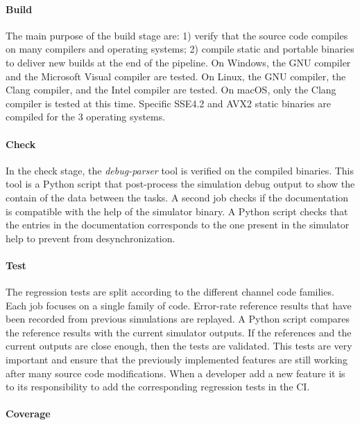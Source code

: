 \paragraph{Build}

The main purpose of the build stage are: 1) verify that the \AFFECT source code
compiles on many compilers and operating systems; 2) compile static and portable
binaries to deliver new builds at the end of the pipeline. On Windows, the GNU
compiler and the Microsoft Visual compiler are tested. On Linux, the GNU
compiler, the Clang compiler, and the Intel compiler are  tested. On macOS, only
the Clang compiler is tested at this time. Specific SSE4.2 and AVX2 static
binaries are compiled for the 3 operating systems.

\paragraph{Check}

In the check stage, the \emph{debug-parser} tool is verified on the compiled
\AFFECT binaries. This tool is a Python script that post-process the \AFFECT
simulation debug output to show the contain of the data between the tasks. A
second job checks if the documentation is compatible with the help of the
\AFFECT simulator binary. A Python script checks that the entries in the
documentation corresponds to the one present in the simulator help to prevent
from desynchronization.

\paragraph{Test}

The regression tests are split according to the different channel code families.
Each job focuses on a single family of code. Error-rate reference results that
have been recorded from previous simulations are replayed. A Python script
compares the reference results with the current simulator outputs. If the
references and the current outputs are close enough, then the tests are
validated. This tests are very important and ensure that the previously
implemented features are still working after many source code modifications.
When a developer add a new feature it is to its responsibility to add the
corresponding regression tests in the CI.

\paragraph{Coverage}


